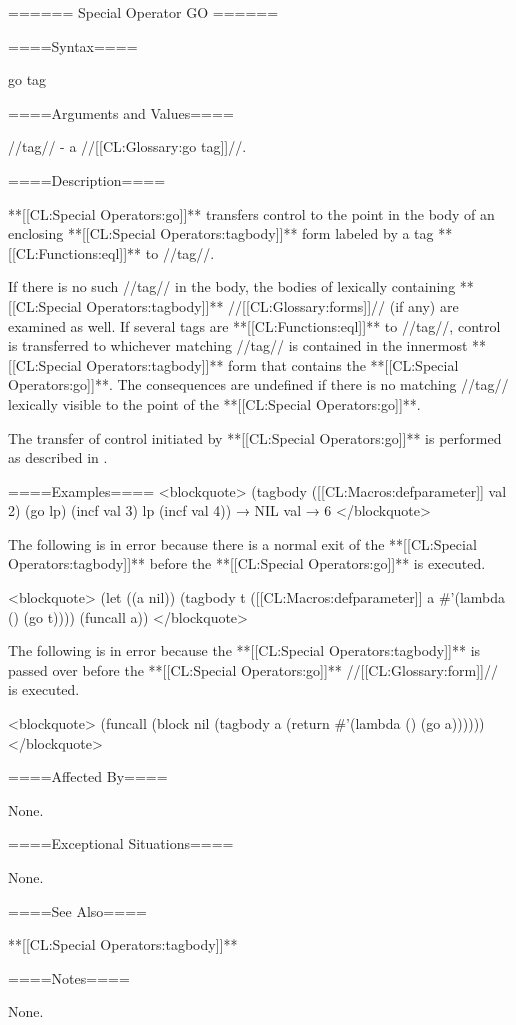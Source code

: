 ====== Special Operator GO ======

====Syntax====

\DefspecNoReturn go {tag}

====Arguments and Values====

//tag// - a //[[CL:Glossary:go tag]]//.

====Description====

**[[CL:Special Operators:go]]** transfers control to the point in the body of an enclosing **[[CL:Special Operators:tagbody]]** form labeled by a tag **[[CL:Functions:eql]]** to //tag//.

If there is no such //tag// in the body, the bodies of lexically containing **[[CL:Special Operators:tagbody]]** //[[CL:Glossary:forms]]// (if any) are examined as well. If several tags are **[[CL:Functions:eql]]** to //tag//, control is transferred to whichever matching //tag// is contained in the innermost **[[CL:Special Operators:tagbody]]** form that contains the **[[CL:Special Operators:go]]**. The consequences are undefined if there is no matching //tag// lexically visible to the point of the **[[CL:Special Operators:go]]**.

The transfer of control initiated by **[[CL:Special Operators:go]]** is performed as described in \secref\TransferOfControl.

====Examples==== <blockquote> (tagbody ([[CL:Macros:defparameter]] val 2) (go lp) (incf val 3) lp (incf val 4)) → NIL val → 6 </blockquote>



The following is in error because there is a normal exit of the **[[CL:Special Operators:tagbody]]** before the **[[CL:Special Operators:go]]** is executed.

<blockquote> (let ((a nil)) (tagbody t ([[CL:Macros:defparameter]] a #'(lambda () (go t)))) (funcall a)) </blockquote>

The following is in error because the **[[CL:Special Operators:tagbody]]** is passed over before the **[[CL:Special Operators:go]]** //[[CL:Glossary:form]]// is executed.

<blockquote> (funcall (block nil (tagbody a (return #'(lambda () (go a)))))) </blockquote>

====Affected By====

None.

====Exceptional Situations====

None.

====See Also====

**[[CL:Special Operators:tagbody]]**

====Notes====

None.


